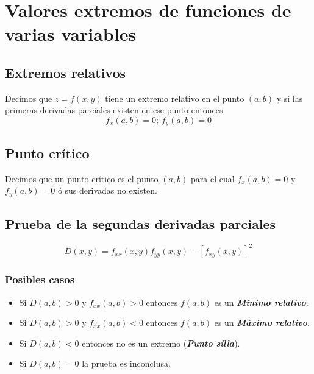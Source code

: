 \documentclass[letterpaper, 12pt]{article}
\begin{document}
        \section{Valores extremos de funciones de varias variables}
        \justify
        \subsection*{Extremos relativos}
        \justify
        Decimos que \(z=f(x,y)\) tiene un extremo relativo en el punto \((a,b)\) y si las primeras derivadas parciales existen en ese punto entonces
        \[f_x(a,b)=0;\, f_y(a,b)=0\]
        \subsection*{Punto crítico}
        \justify
        Decimos que un punto crítico es el punto \((a,b)\) para el cual \(f_x(a,b)=0\) y \(f_y(a,b)=0\) ó sus derivadas no existen.
        \subsection*{Prueba de la segundas derivadas parciales}
        \[D(x,y)=f_{xx}(x,y)f_{yy}(x,y)-[f_{xy}(x,y)]^2\]
        \subsubsection*{Posibles casos}
        \begin{itemize}
            \item Si \(D(a,b)>0\) y \(f_{xx}(a,b)>0\) entonces \(f(a,b)\) es un \emph{\textbf{Mínimo relativo}}.
            \item Si \(D(a,b)>0\) y \(f_{xx}(a,b)<0\) entonces \(f(a,b)\) es un \emph{\textbf{Máximo relativo}}.
            \item Si \(D(a,b)<0\) entonces no es un extremo (\emph{\textbf{Punto silla}}).
            \item Si \(D(a,b)=0\) la prueba es inconclusa.
        \end{itemize}
\end{document}
